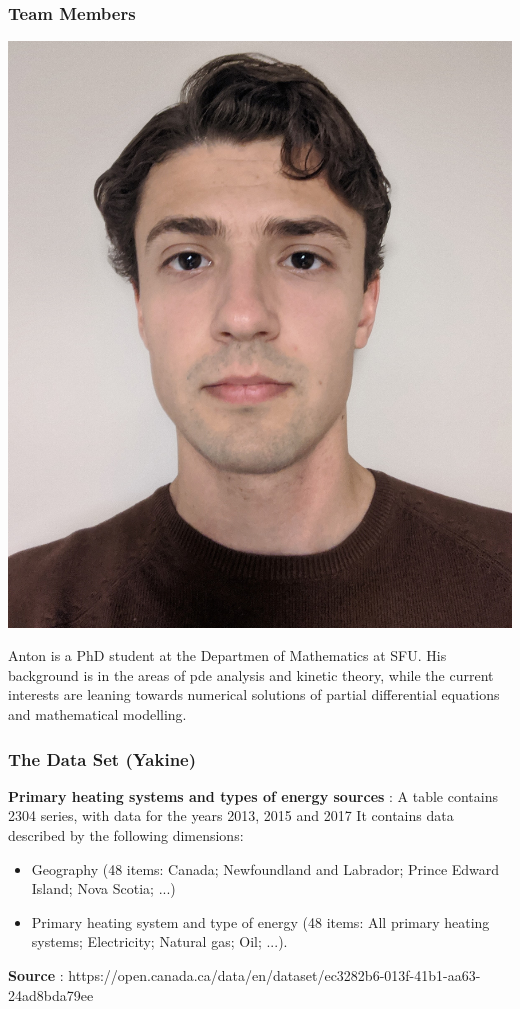 \documentclass{beamer}
\begin{document}
\begin{frame}
\frametitle{Team Members}

\vspace{10pt}
\begin{minipage}[b]{0.15\textwidth}
\includegraphics[width=\textwidth, trim={70pt 170pt 70pt 100pt}, clip]{TeamPics/ryan.jpg}
\end{minipage}\hspace{0.05\textwidth}%
\begin{minipage}[b]{0.8\textwidth}
{\small Anton is a PhD student at the Departmen of Mathematics at SFU. His background is in the areas of pde analysis and kinetic theory, while the current interests are leaning towards numerical solutions of partial differential equations and mathematical modelling. }
\end{minipage}


\end{frame}





\begin{frame}
\frametitle{The Data Set (Yakine)}
\textbf{Primary heating systems and types of energy sources} : A table contains 2304 series, with data for the years 2013, 2015 and 2017
It contains data described by the following dimensions:
\begin{itemize}
\item Geography (48 items: Canada; Newfoundland and Labrador; Prince Edward Island; Nova Scotia; ...)
\item Primary heating system and type of energy (48 items: All primary heating systems; Electricity; Natural gas; Oil; ...).
\end{itemize}
\textbf{Source} : https://open.canada.ca/data/en/dataset/ec3282b6-013f-41b1-aa63-24ad8bda79ee
\end{frame}
\end{document}
